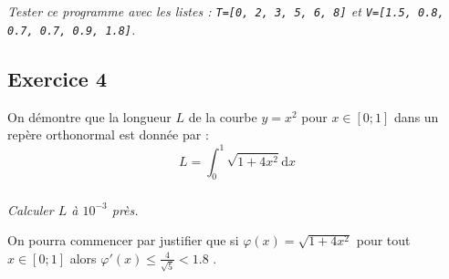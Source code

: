 \documentclass[10pt,oneside]{article}
\begin{document}
\subparagraph{}
\textit{Tester ce programme avec les listes : \texttt{T=[0, 2, 3, 5, 6, 8]} et \texttt{V=[1.5, 0.8, 0.7, 0.7, 0.9, 1.8]}.}


\subsection*{Exercice 4}
\setcounter{subparagraph}{0}


\begin{minipage}{4cm}
\end{minipage}

\hfill
\begin{minipage}{12cm}
On démontre que la longueur $L$ de la courbe $y=x^2$ pour $x\in[0;1]$ dans un repère orthonormal est donnée par :
$$L=\int_0^1\sqrt{1+4x^2}\text{d}x$$

\subparagraph*{}\textit{Calculer $L$ à $10^{-3}$ près.}

\medskip

On pourra commencer par justifier que si $\varphi(x)=\sqrt{1+4x^2}$ pour tout $x\in[0;1]$ alors $\varphi'(x)\leq\frac{4}{\sqrt{5}}<1.8$ .
\end{minipage}\hfill\hbox{}
\end{document}
